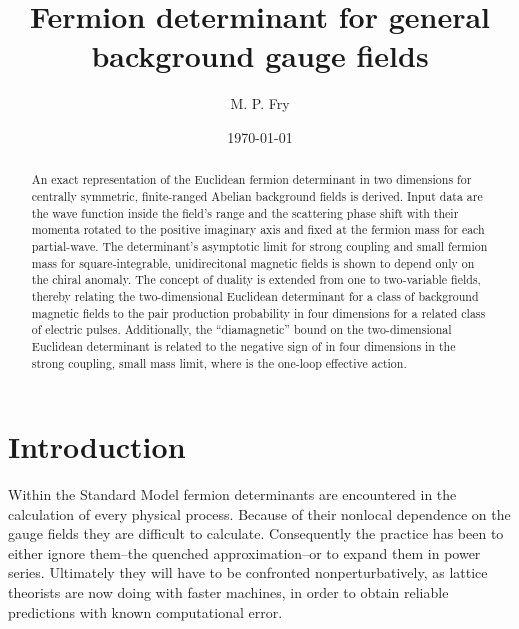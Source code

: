 \documentclass[a4paper,twocolumn,showpacs,preprintnumbers,amsmath,amssymb]{revtex4}
\begin{document}
\title{Fermion determinant for general background gauge fields}

\author{M. P. Fry}


\date{\today}

\begin{abstract}
An exact representation of the Euclidean fermion determinant in two
dimensions for centrally symmetric, finite-ranged Abelian background
fields is derived. Input data are the wave function inside the field's
range and the scattering phase shift with their momenta rotated to the
positive imaginary axis and fixed at the fermion mass for each
partial-wave. The determinant's asymptotic limit for strong coupling
and small fermion mass for square-integrable, unidirecitonal magnetic
fields is shown to depend only on the chiral anomaly. The concept of
duality is extended from one to two-variable fields, thereby relating
the two-dimensional Euclidean determinant for a class of background
magnetic fields to the pair production probability in four dimensions
for a related class of electric pulses. Additionally, the
``diamagnetic'' bound on the two-dimensional Euclidean determinant is
related to the negative sign of
\coordHE{} in four dimensions in
the strong coupling, small mass limit, where \coordHE{} is the
one-loop effective action.
\end{abstract}


\maketitle


\section{\label{Sec_SecI}
Introduction}


Within the Standard Model fermion determinants are encountered in
the calculation of every physical process. Because of their nonlocal
dependence on the gauge fields they are difficult to calculate.
Consequently the practice has been to either ignore them--the quenched
approximation--or to expand them in power series. Ultimately they will
have to be confronted nonperturbatively, as lattice theorists are now
doing with faster machines, in order to obtain reliable predictions
with known computational error.
\end{document}
